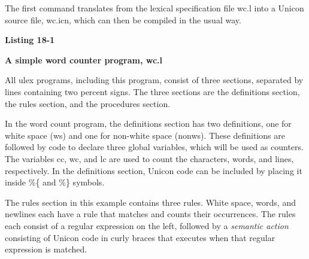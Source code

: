 
The first command translates from the lexical specification file wc.l into a
Unicon source file, wc.icn, which can then be compiled in the usual way.

\bigskip

{\sffamily\bfseries
Listing 18-1}

{\sffamily\bfseries
A simple word counter program, wc.l}


All \textsf{ulex} programs, including this program, consist of three
sections, separated by lines containing two percent signs. The three
sections are the definitions section, the rules section, and the
procedures section.

In the word count program, the definitions section has two definitions,
one for white space (\textsf{ws}) and one for non-white space
(\textsf{nonws}). These definitions are followed by code to declare
three global variables, which will be used as counters. The variables
\textsf{cc}, \textsf{wc}, and \textsf{lc} are used to count the
characters, words, and lines, respectively. In the definitions
section, Unicon code can be included by placing it inside \%\{
and \%\} symbols.

The rules section in this example contains three rules. White space,
words, and newlines each have a rule that matches and counts their
occurrences. The rules each consist of a regular expression on the
left, followed by a {\em semantic action\/} consisting of Unicon code
in curly braces that executes when that regular expression is matched.

